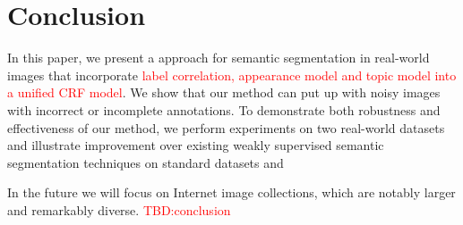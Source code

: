 \section{Conclusion}
In this paper, we present a approach for semantic segmentation in real-world images that incorporate {\textcolor{red}{ label correlation, appearance model and topic model into a unified CRF model}}. We show that our method can put up with noisy images with incorrect or incomplete annotations. To demonstrate both robustness and effectiveness of our method, we perform experiments on two real-world datasets and illustrate improvement over existing weakly supervised semantic segmentation techniques on standard datasets and

In the future we will focus on Internet image collections, which are notably larger and remarkably diverse. {\textcolor{red}{TBD:conclusion}}
